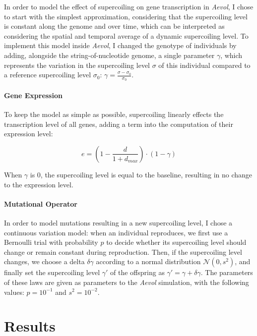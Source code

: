 In order to model the effect of supercoiling on gene transcription in \emph{Aevol}, I chose to start with the simplest approximation, considering that the supercoiling level is constant along the genome and over time, which can be interpreted as considering the spatial and temporal average of a dynamic supercoiling level.
To implement this model inside \emph{Aevol}, I changed the genotype of individuals by adding, alongside the string-of-nucleotide genome, a single parameter $\gamma$, which represents the variation in the supercoiling level $\sigma$ of this individual compared to a reference supercoiling level $\sigma_0$: $\gamma = \frac{\sigma-\sigma_0}{\sigma_0}$.

\paragraph{Gene Expression}
To keep the model as simple as possible, supercoiling linearly effects the transcription level of all genes, adding a term into the computation of their expression level:

\begin{equation}
e = (1 - \frac{d}{1+d_{max}}) \cdot (1 - \gamma)
\label{eq:aevol_sc}
\end{equation}

When $\gamma$ is 0, the supercoiling level is equal to the baseline, resulting in no change to the expression level.

\paragraph{Mutational Operator}
In order to model mutations resulting in a new supercoiling level, I chose a continuous variation model: when an individual reproduces, we first use a Bernoulli trial with probability $p$ to decide whether its supercoiling level should change or remain constant during reproduction.
Then, if the supercoiling level changes, we choose a delta $\delta\gamma$ according to a normal distribution $\mathcal{N}(0, s^2)$, and finally set the supercoiling level $\gamma'$ of the offspring as $\gamma' = \gamma + \delta\gamma$.
The parameters of these laws are given as parameters to the \emph{Aevol} simulation, with the following values: $p = 10^{-1}$ and $s^2 = 10^{-2}$.


\section{Results}
\label{sec:aevol_results}

